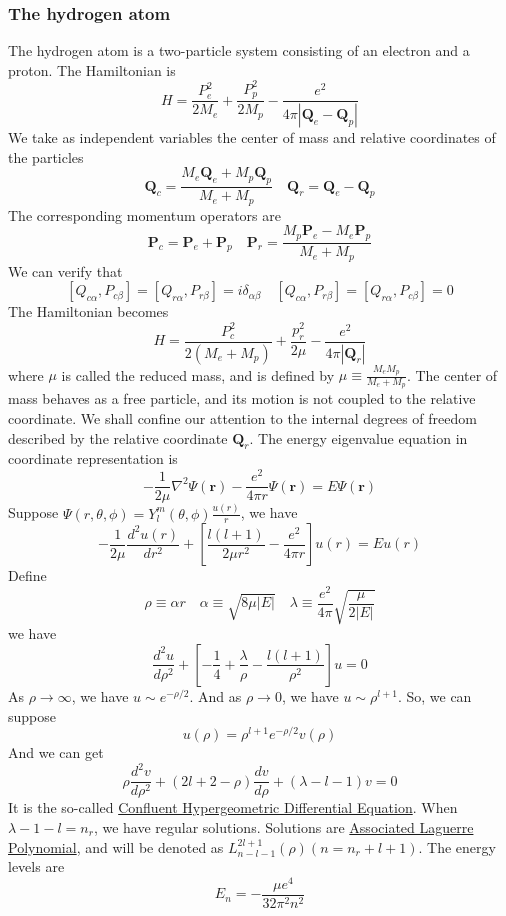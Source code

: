 \subsubsection{The hydrogen atom}
The hydrogen atom is a two-particle system consisting of an electron and a proton. The Hamiltonian is
\[H = \frac{P_e^2}{2M_e} + \frac{P_p^2}{2M_p} - \frac{e^2}{4\pi|\bm{Q}_e-\bm{Q}_p|}\]
We take as independent variables the center of mass and relative coordinates of the particles
\[\bm{Q}_c = \frac{M_e\bm{Q}_e + M_p\bm{Q}_p}{M_e+M_p} \quad \bm{Q}_r = \bm{Q}_e-\bm{Q}_p\]
The corresponding momentum operators are
\[\bm{P}_c = \bm{P}_e + \bm{P}_p \quad \bm{P}_r = \frac{M_p\bm{P}_e-M_e\bm{P}_p}{M_e + M_p}\]
We can verify that
\[[Q_{c\alpha},P_{c\beta}] = [Q_{r\alpha},P_{r\beta}] = i\delta_{\alpha\beta} \quad [Q_{c\alpha},P_{r\beta}] = [Q_{r\alpha},P_{c\beta}] = 0\]
The Hamiltonian becomes
\[H = \frac{P_c^2}{2(M_e+M_p)} + \frac{p_r^2}{2\mu} - \frac{e^2}{4\pi|\bm{Q}_r|}\]
where $\mu$ is called the reduced mass, and is defined by $\mu \equiv \frac{M_eM_p}{M_e+M_p}$.
The center of mass behaves as a free particle, and its
motion is not coupled to the relative coordinate. We shall confine our attention to the internal degrees of freedom described by the relative coordinate $\bm{Q}_r$. The energy eigenvalue equation in coordinate representation is
\[-\frac{1}{2\mu}\nabla^2 \Psi(\bm{r})  -\frac{e^2}{4\pi r} \Psi(\bm{r}) = E\Psi(\bm{r})\]
Suppose $\Psi(r,\theta,\phi) = Y_l^m(\theta,\phi) \frac{u(r)}{r}$, we have
\[-\frac{1}{2\mu} \frac{d^2 u(r)}{dr^2} + \left[ \frac{l(l+1)}{2\mu r^2} - \frac{e^2}{4\pi r}\right]u(r) = Eu(r)\]
Define
\[\rho \equiv \alpha r \quad \alpha \equiv \sqrt{8\mu|E|} \quad \lambda \equiv \frac{e^2}{4\pi} \sqrt{\frac{\mu}{2|E|}}\]
we have
\[\frac{d^2 u}{d\rho^2} + \left[ -\frac{1}{4} + \frac{\lambda}{\rho} - \frac{l(l+1)}{\rho^2} \right] u = 0\]
As $\rho \to \infty$, we have $u \sim e^{-\rho/2}$. And as $\rho \to 0$, we have $u \sim \rho^{l+1}$. So, we can suppose
\[u(\rho) = \rho^{l+1} e^{-\rho/2} v(\rho)\]
And we can get
\[\rho \frac{d^2 v}{d\rho^2} + (2l+2-\rho)\frac{dv}{d\rho} + (\lambda-l-1)v = 0\]
It is the so-called \href{http://mathworld.wolfram.com/ConfluentHypergeometricDifferentialEquation.html}{Confluent Hypergeometric Differential Equation}.
When $\lambda - 1- l = n_r$, we have regular solutions. Solutions are \href{https://en.wikipedia.org/wiki/Laguerre_polynomials#Generalized_Laguerre_polynomials}{Associated Laguerre Polynomial}, and will be denoted as $L_{n-l-1}^{2l+1}(\rho) (n=n_r+l+1)$. The energy levels are
\[E_n = -\frac{\mu e^4}{32\pi^2 n^2}\]
